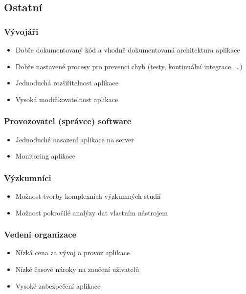 \subsection*{Ostatní}\label{subsec:ostatni}

\subsubsection*{Vývojáři}\label{subsubsec:vyvojari}

\begin{itemize}
  \item
  Dobře dokumentovaný kód a vhodně dokumentovaná architektura aplikace
  \item
  Dobře nastavené procesy pro prevenci chyb (testy, kontinuální
  integrace, \ldots{})
  \item
  Jednoduchá rozšiřitelnost aplikace
  \item
  Vysoká modifikovatelnost aplikace
\end{itemize}

\subsubsection*{Provozovatel (správce) software}\label{subsubsec:provozovatel-spravce-software}

\begin{itemize}
  \item
  Jednoduché nasazení aplikace na server
  \item
  Monitoring aplikace
\end{itemize}

\subsubsection*{Výzkumníci}\label{subsubsec:vyzkumnici}

\begin{itemize}
  \item
  Možnost tvorby komplexních výzkumných studií
  \item
  Možnost pokročilé analýzy dat vlastním nástrojem
\end{itemize}

\subsubsection*{Vedení organizace}\label{subsubsec:vedeni-organizace}

\begin{itemize}
  \item
  Nízká cena za vývoj a provoz aplikace
  \item
  Nízké časové nároky na zaučení uživatelů
  \item
  Vysoké zabezpečení aplikace
\end{itemize}
